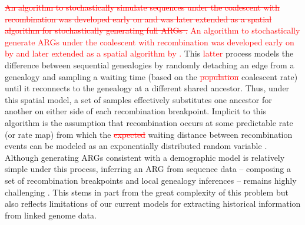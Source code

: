 \documentclass[11pt]{article}
\begin{document}
\textcolor{red}{
\sout{An algorithm to stochastically simulate sequences under the coalescent with 
recombination was developed early on \mbox{\citep{hudson1983properties}} 
and was later extended as a spatial algorithm for stochastically generating full 
ARGs \mbox{\citep{wiuf_recombination_1999}}.
} 
An algorithm to stochastically generate ARGs under the coalescent with 
recombination was developed early on by \citet{hudson1983properties} and 
later extended as a spatial algorithm by \citet{wiuf_recombination_1999}.
}
This \textcolor{red}{latter} process models the difference between sequential 
genealogies by randomly detaching an edge from a genealogy and sampling
a waiting time (based on the 
\textcolor{red}{\sout{population}}
coalescent rate) until it reconnects to the genealogy at a different shared ancestor.
Thus, under this spatial model, a set of samples effectively substitutes
one ancestor for another on either side of each recombination breakpoint.
Implicit to this algorithm is the assumption that recombination 
occurs at some predictable rate (or rate map) from which the 
\textcolor{red}{\sout{expected}}
waiting distance between recombination events can be modeled as an 
exponentially distributed random variable \citep{wiuf_recombination_1999}.
Although generating ARGs consistent with a demographic model is 
relatively simple under this process, inferring an ARG from sequence data 
-- composing a set of recombination breakpoints and local genealogy inferences -- 
remains highly challenging \citep{y_c_brandt_evaluation_2022}.
This stems in part from the great complexity of this problem 
but also reflects limitations of our current models for 
extracting historical information from linked genome data.
\end{document}
